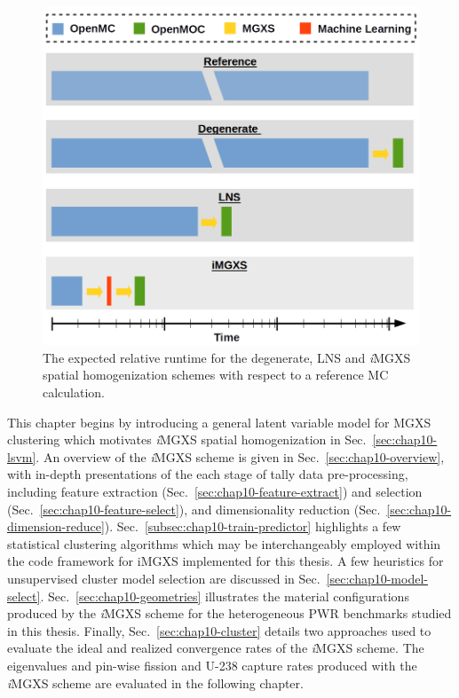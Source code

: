 \begin{figure}[h!]
\centering
\includegraphics[width=0.6\linewidth]{figures/unsupervised/flow-chart}
\vspace{2mm}
\caption[Expected relative runtime for different homogenization schemes]{The expected relative runtime for the degenerate, \ac{LNS} and \textit{i}\ac{MGXS} spatial homogenization schemes with respect to a reference \ac{MC} calculation.}
\label{fig:chap10-flow-chart}
\end{figure}

This chapter begins by introducing a general latent variable model for \ac{MGXS} clustering which motivates \textit{i}\ac{MGXS} spatial homogenization in Sec.~\ref{sec:chap10-lsvm}. An overview of the \textit{i}\ac{MGXS} scheme is given in Sec.~\ref{sec:chap10-overview}, with in-depth presentations of the each stage of tally data pre-processing, including feature extraction (Sec.~\ref{sec:chap10-feature-extract}) and selection (Sec.~\ref{sec:chap10-feature-select}), and dimensionality reduction (Sec.~\ref{sec:chap10-dimension-reduce}). Sec.~\ref{subsec:chap10-train-predictor} highlights a few statistical clustering algorithms which may be interchangeably employed within the code framework for i\ac{MGXS} implemented for this thesis. A few heuristics for unsupervised cluster model selection are discussed in Sec.~\ref{sec:chap10-model-select}. Sec.~\ref{sec:chap10-geometries} illustrates the material configurations produced by the \textit{i}\ac{MGXS} scheme for the heterogeneous \ac{PWR} benchmarks studied in this thesis. Finally, Sec.~\ref{sec:chap10-cluster} details two approaches used to evaluate the ideal and realized convergence rates of the \textit{i}\ac{MGXS} scheme. The eigenvalues and pin-wise fission and U-238 capture rates produced with the \textit{i}\ac{MGXS} scheme are evaluated in the following chapter.


